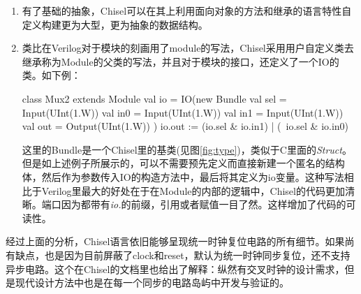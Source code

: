 \begin{enumerate}[label=(\alph*)]
	\item 有了基础的抽象，Chisel可以在其上利用面向对象的方法和继承的语言特性自定义构建更为大型，更为抽象的数据结构。
	\item 类比在Verilog对于模块的刻画用了module的写法，Chisel采用用户自定义类去继承称为Module的父类的写法，并且对于模块的接口，还定义了一个IO的类。如下例\citep{chisel2017}：
	\begin{scala}
		class Mux2 extends Module {
			val io = IO(new Bundle{
				val sel = Input(UInt(1.W))
				val in0 = Input(UInt(1.W))
				val in1 = Input(UInt(1.W))
				val out = Output(UInt(1.W))
			})
			io.out := (io.sel & io.in1) | (~io.sel & io.in0)
		}
	\end{scala}
	这里的Bundle是一个Chisel里的基类(见图\ref{fig:type})，类似于C里面的\textit{Struct}。但是如上述例子所展示的，可以不需要预先定义而直接新建一个匿名的结构体，然后作为参数传入IO的构造方法中，最后将其定义为io变量。这种写法相比于Verilog里最大的好处在于在Module的内部的逻辑中，Chisel的代码更加清晰。端口因为都带有\textit{io.}的前缀，引用或者赋值一目了然。这样增加了代码的可读性。
\end{enumerate}

经过上面的分析，Chisel语言依旧能够呈现统一时钟复位电路的所有细节。如果尚有缺点，也是因为目前屏蔽了clock和reset，默认为统一时钟同步复位，还不支持异步电路。这个在Chisel的文档里也给出了解释：纵然有交叉时钟的设计需求，但是现代设计方法中也是在每一个同步的电路岛屿中开发与验证的\citep{chisel2017}。

